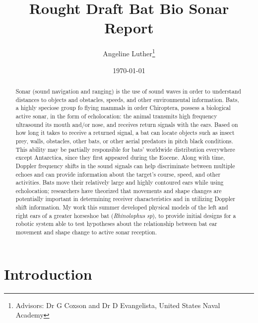 \documentclass{article}
\title{Rought Draft Bat Bio Sonar Report}
\author{Angeline Luther\thanks{Advisors: Dr G Coxson and Dr D Evangelista, United States Naval Academy}}
\date{\today}
\begin{document}
\maketitle

\begin{abstract}
Sonar (sound navigation and ranging) is the use of sound waves in order to understand distances to objects and obstacles, speeds, and other environmental information.  Bats, a highly speciose group fo flying mammals in order Chiroptera, possess a biological active sonar, in the form of echolocation: the animal transmits high frequency ultrasound its mouth and/or nose, and receives return signals with the ears.  Based on how long it takes to receive a returned signal, a bat can locate objects such as insect prey, walls, obstacles, other bats, or other aerial predators in pitch black conditions. This ability may be partially responsible for bats' worldwide distribution everywhere except Antarctica, since they first appeared during the Eocene. Along with time, Doppler frequency shifts in the sound signals can help discriminate between multiple echoes and can provide information about the target's course, speed, and other activities. Bats move their relatively large and highly contoured ears while using echolocation; researchers have theorized that movements and shape changes are potentially important in determining receiver characteristics and in utilizing Doppler shift information. My work this summer developed physical models of the left and right ears of a greater horseshoe bat (\emph{Rhinolophus sp}), to provide initial designs for a robotic system able to test hypotheses about the relationship between bat ear movement and shape change to active sonar reception.  
\end{abstract}

\section{Introduction}
\end{document}
